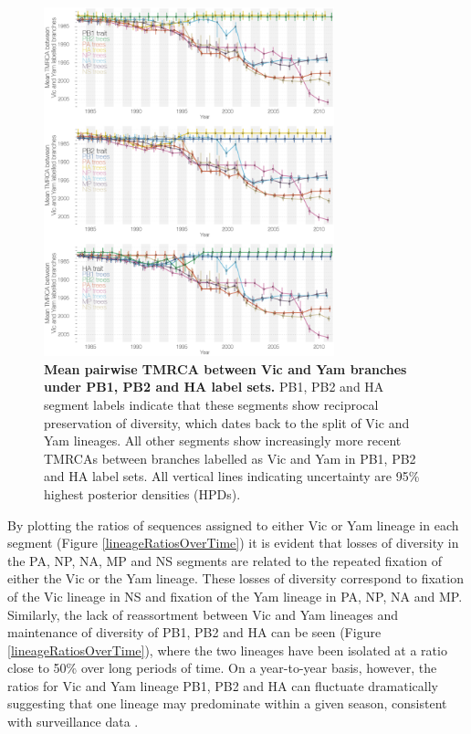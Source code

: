 \documentclass[11pt,oneside,letterpaper]{article}
\begin{document}
\begin{figure}[h]
	\centering		
	\includegraphics[width=0.75\textwidth]{figures/InfB_betweenDiversity.png}
	\caption{\textbf{Mean pairwise TMRCA between Vic and Yam branches under PB1, PB2 and HA label sets.}
PB1, PB2 and HA segment labels indicate that these segments show reciprocal preservation of diversity, which dates back to the split of Vic and Yam lineages.
All other segments show increasingly more recent TMRCAs between branches labelled as Vic and Yam in PB1, PB2 and HA label sets.
All vertical lines indicating uncertainty are 95\% highest posterior densities (HPDs).}
	\label{betweenDiversity}
\end{figure}

By plotting the ratios of sequences assigned to either Vic or Yam lineage in each segment (Figure \ref{lineageRatiosOverTime}) it is evident that losses of diversity in the PA, NP, NA, MP and NS segments are related to the repeated fixation of either the Vic or the Yam lineage.
These losses of diversity correspond to fixation of the Vic lineage in NS and fixation of the Yam lineage in PA, NP, NA and MP.
Similarly, the lack of reassortment between Vic and Yam lineages and maintenance of diversity of PB1, PB2 and HA can be seen (Figure \ref{lineageRatiosOverTime}), where the two lineages have been isolated at a ratio close to 50\% over long periods of time.
On a year-to-year basis, however, the ratios for Vic and Yam lineage PB1, PB2 and HA can fluctuate dramatically suggesting that one lineage may predominate within a given season, consistent with surveillance data \cite{reed2012}.
\end{document}

